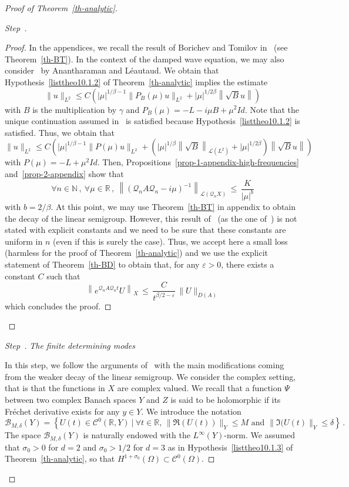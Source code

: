 \documentclass[10pt]{amsart}
\theoremstyle{definition}\newtheorem{defi}[theo]{Definition}\newtheorem{rema}[theo]{Remark}\newtheorem{exam}[theo]{Example}\newtheorem{exem}[theo]{Example}\newtheorem{nota}[theo]{Notation}
\newcommand{\RR}{\mathbb{R}}
\newcommand{\NN}{\mathbb{N}}
\newcommand{\Cc}{\mathcal{C}}
\newcommand{\Bc}{\mathcal{B}}
\newcommand{\Lc}{\mathcal{L}}
\newcommand{\Qc}{\mathcal{Q}}
\newcounter{stepcount}
\newenvironment{step}{\refstepcounter{stepcount}\begin{proof}[Step~\thestepcount]}{\let\qed\relax\end{proof}}
\let\oldforall\forall
\renewcommand*{\forall}{\mathrel{\oldforall}}
\begin{document}
\begin{proof}[{Proof of Theorem~\ref{th-analytic}}]
\begin{step}
\begin{proof}
In the appendices, we recall the result of Borichev and Tomilov in~\cite{Bor-Tom} (see Theorem~\ref{th-BT}). In the context of the damped wave equation, we may also consider~\cite[Proposition~2.4]{Ana-Leau} by Anantharaman and Léautaud. We obtain that Hypothesis~\eqref{listtheo10.1.2} of Theorem~\ref{th-analytic} implies the estimate
\begin{equation}
\|u\|_{L^2}\leq C \left(|\mu|^{1/\beta-1} \|P_B(\mu)u\|_{L^2} + |\mu|^{1/2\beta} \left\|\sqrt{B} u \right\| \right)
\end{equation}
with $B$ is the multiplication by $\gamma$ and $P_B(\mu)=-L-i\mu B+\mu^2 Id$. Note that the unique continuation assumed in~\cite[Proposition~2.4]{Ana-Leau} is satisfied because Hypothesis~\eqref{listtheo10.1.2} is satisfied. Thus, we obtain that
\begin{equation}\label{eq-demo-analytic-1}
\|u\|_{L^2}\leq C \left(|\mu|^{1/\beta-1} \|P(\mu)u\|_{L^2} +
\left(|\mu|^{1/\beta} \left\|\sqrt{B}\right\|_{\Lc(L^2)} + |\mu|^{1/2\beta}\right)
\left\|\sqrt{B} u\right\| \right)
\end{equation}
with $P(\mu)=-L+\mu^2 Id$. Then, Propositions~\ref{prop-1-appendix-high-frequencies} and~\ref{prop-2-appendix} show that
\[
\forall n\in\NN\,,\:\forall \mu\in\RR\,,\:\left\|(\Qc_n A \Qc_n -
i\mu)^{-1}\right\|_{\Lc(\Qc_n X)}\,\leq\,\frac K{|\mu|^b}
\]
with $b=2/\beta$. At this point, we may use Theorem~\ref{th-BT} in appendix to obtain the decay of the linear semigroup. However, this result of~\cite{Bor-Tom} (as the one of~\cite{Ana-Leau}) is not stated with explicit constants and we need to be sure that these constants are uniform in $n$ (even if this is surely the case). Thus, we accept here a small loss (harmless for the proof of Theorem~\ref{th-analytic}) and we use the explicit statement of Theorem~\ref{th-BD} to obtain that, for any $\varepsilon>0$, there exists a constant $C$ such that
\[
\left\|e^{\Qc_nA\Qc_n t} U\right\|_{X}\,\leq\,\frac C
{t^{\beta/2-\varepsilon}}
\, \|U\|_{D(A)}
\]
which concludes the proof.
\end{proof}
\end{step}

\begin{step}\emph{The finite determining modes\label{step3prooftheo10.1}}

In this step, we follow the arguments of~\cite{Hale-Raugel} with the main modifications coming from the weaker decay of the linear semigroup. We consider the complex setting, that is that the functions in $X$ are complex valued. We recall that a function $\Psi$ between two complex Banach spaces $Y$ and $Z$ is said to be holomorphic if its Fréchet derivative exists for any $y\in Y$. We introduce the notation
\[
\Bc_{M,\delta}(Y) = \left\{U(t)\in \Cc^0(\RR,Y)\:|\:\forall
t\in\RR,\,\|\Re(U(t))\|_Y\leq M\text{ and }\|\Im(U(t)\|_Y \leq \delta \right\}\,.
\]
The space $\Bc_{M,\delta}(Y)$ is naturally endowed with the $L^\infty(Y)$-norm. We assumed that $\sigma_0>0$ for $d=2$ and $\sigma_0>1/2$ for $d=3$ as in Hypothesis~\eqref{listtheo10.1.3} of Theorem~\ref{th-analytic}, so that $H^{1+\sigma_0}(\Omega)\subset \Cc^0(\Omega)$.


\end{step}
\end{proof}
\end{document}
